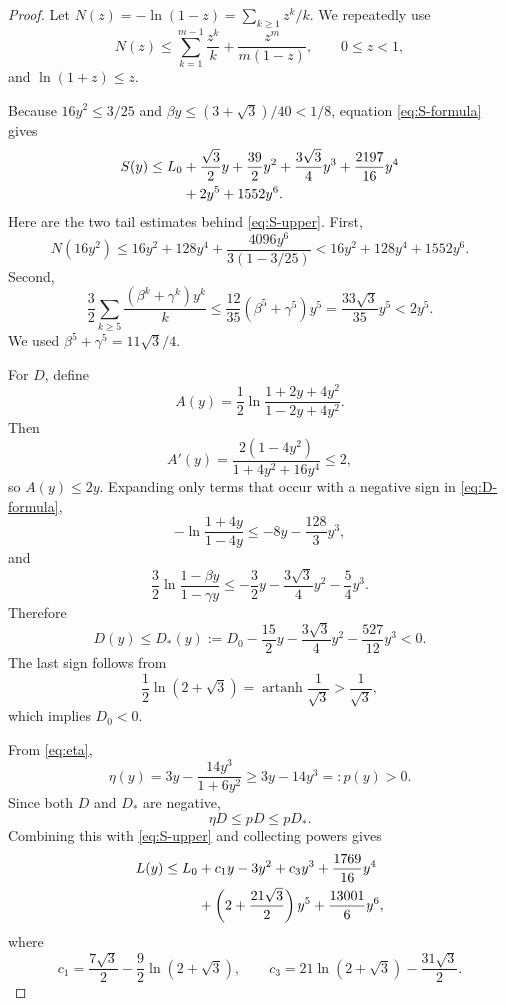 \documentclass[11pt]{article}
\theoremstyle{definition}
\newcommand{\1}{\mathbf{1}}
\begin{document}
\begin{proof}
Let $N(z)=-\ln(1-z)=\sum_{k\ge1}z^k/k$.  We repeatedly use
\begin{equation}
N(z)\le\sum_{k=1}^{m-1}\frac{z^k}{k}
      +\frac{z^m}{m(1-z)},
\qquad 0\le z<1,
\label{eq:N-tail}
\end{equation}
and $\ln(1+z)\le z$.

Because $16y^2\le3/25$ and $\beta y\le(3+\sqrt3)/40<1/8$, equation \eqref{eq:S-formula} gives
\begin{align}
S(y)\le L_0
&+\frac{\sqrt3}{2}y+\frac{39}{2}y^2
 +\frac{3\sqrt3}{4}y^3+\frac{2197}{16}y^4\notag\\
&+2y^5+1552y^6.
\label{eq:S-upper}
\end{align}
Here are the two tail estimates behind \eqref{eq:S-upper}.  First,
\[
N(16y^2)
\le16y^2+128y^4
 +\frac{4096y^6}{3(1-3/25)}
<16y^2+128y^4+1552y^6.
\]
Second,
\[
\frac32\sum_{k\ge5}\frac{(\beta^k+\gamma^k)y^k}{k}
\le\frac{12}{35}(\beta^5+\gamma^5)y^5
=\frac{33\sqrt3}{35}y^5<2y^5.
\]
We used $\beta^5+\gamma^5=11\sqrt3/4$.

For $D$, define
\[
A(y)=\frac12\ln\frac{1+2y+4y^2}{1-2y+4y^2}.
\]
Then
\[
A'(y)=\frac{2(1-4y^2)}{1+4y^2+16y^4}\le2,
\]
so $A(y)\le2y$.  Expanding only terms that occur with a negative sign in \eqref{eq:D-formula},
\[
-\ln\frac{1+4y}{1-4y}
\le-8y-\frac{128}{3}y^3,
\]
and
\[
\frac32\ln\frac{1-\beta y}{1-\gamma y}
\le-\frac32y-\frac{3\sqrt3}{4}y^2-\frac54y^3.
\]
Therefore
\begin{equation}
D(y)\le D_*(y):=
D_0-\frac{15}{2}y-\frac{3\sqrt3}{4}y^2-\frac{527}{12}y^3<0.
\label{eq:D-upper}
\end{equation}
The last sign follows from
\[
\frac12\ln(2+\sqrt3)
=\operatorname{artanh}\frac1{\sqrt3}
>\frac1{\sqrt3},
\]
which implies $D_0<0$.

From \eqref{eq:eta},
\begin{equation}
\eta(y)=3y-\frac{14y^3}{1+6y^2}
\ge3y-14y^3=:p(y)>0.
\label{eq:eta-lower}
\end{equation}
Since both $D$ and $D_*$ are negative,
\[
\eta D\le pD\le pD_*.
\]
Combining this with \eqref{eq:S-upper} and collecting powers gives
\begin{align}
L(y)\le L_0
&+c_1y-3y^2+c_3y^3+\frac{1769}{16}y^4\notag\\
&+\left(2+\frac{21\sqrt3}{2}\right)y^5
 +\frac{13001}{6}y^6,
\label{eq:pre-P}
\end{align}
where
\[
c_1=\frac{7\sqrt3}{2}-\frac92\ln(2+\sqrt3),
\qquad
c_3=21\ln(2+\sqrt3)-\frac{31\sqrt3}{2}.
\]


\end{proof}
\end{document}
